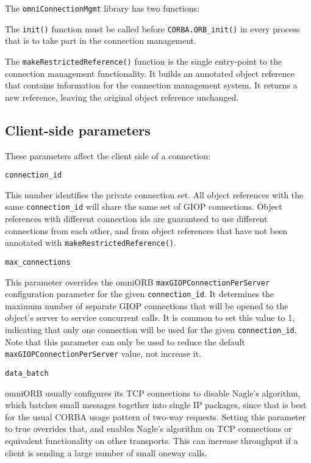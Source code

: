 \documentclass[11pt,oneside,a4paper]{book}
\makeatletter
\newcommand{\code}[1]{\texttt{#1}}
\newcommand{\op}[1]{\texttt{#1()}}
\newcommand{\confoptnd}[1]
  {\vspace{\baselineskip}\par\noindent\code{#1}}
\renewcommand{\confoptnd}[1]
  {\vspace{\baselineskip}\par\noindent\code{#1}\\[-1ex]\@afterheading}
\makeatother
\begin{document}
The \code{omniConnectionMgmt} library has two functions:

\begin{pylisting}
  init()
  makeRestrictedReference(object_ref,
			  connection_id,
			  max_connections,
			  max_threads,
			  data_batch,
			  permit_interleaved,
			  server_hold_open);
};
\end{pylisting}



The \op{init} function must be called before \op{CORBA.ORB\_init} in
every process that is to take part in the connection management.

The \op{makeRestrictedReference} function is the single entry-point to
the connection management functionality. It builds an annotated object
reference that contains information for the connection management
system. It returns a new reference, leaving the original object
reference unchanged.

\subsection{Client-side parameters}

These parameters affect the client side of a connection:

\clearpage %

\confoptnd{connection\_id}

This number identifies the private connection set. All object
references with the same \code{connection\_id} will share the same set
of GIOP connections. Object references with different connection ids
are guaranteed to use different connections from each other, and from
object references that have not been annotated with
\op{makeRestrictedReference}.

\confoptnd{max\_connections}

This parameter overrides the omniORB \code{maxGIOPConnectionPerServer}
configuration parameter for the given \code{connection\_id}. It
determines the maximum number of separate GIOP connections that will
be opened to the object's server to service concurrent calls. It is
common to set this value to 1, indicating that only one connection
will be used for the given \code{connection\_id}. Note that this
parameter can only be used to reduce the default
\code{maxGIOPConnectionPerServer} value, not increase it.

\confoptnd{data\_batch}

omniORB usually configures its TCP connections to disable Nagle's
algorithm, which batches small messages together into single IP
packages, since that is best for the usual CORBA usage pattern of
two-way requests. Setting this parameter to true overrides that, and
enables Nagle's algorithm on TCP connections or equivalent
functionality on other transports. This can increase throughput if a
client is sending a large number of small oneway calls.
\end{document}
